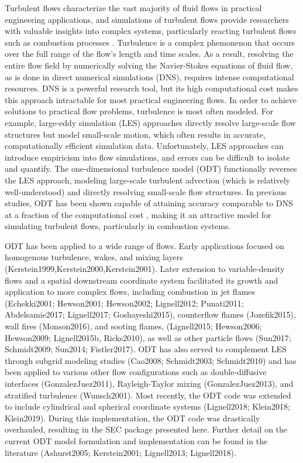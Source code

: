 \documentclass[preprint,12pt, a4paper]{elsarticle}
\begin{document}
Turbulent flows characterize the vast majority of fluid flows in practical engineering applications, and simulations of turbulent flows provide researchers with valuable insights into complex systems, particularly reacting turbulent flows such as combustion processes \cite{Pope2000}. Turbulence is a complex phemonenon that occurs over the full range of the flow's length and time scales. As a result, resolving the entire flow field by numerically solving the Navier-Stokes equations of fluid flow, as is done in direct numerical simulations (DNS), requires intense computational resources. DNS is a powerful research tool, but its high computational cost makes this approach intractable for most practical engineering flows. In order to achieve solutions to practical flow problems, turbulence is most often modeled. For example, large-eddy simulation (LES) approaches directly resolve large-scale flow structures but model small-scale motion, which often results in accurate, computationally efficient simulation data. Unfortunately, LES approaches can introduce empiricism into flow simulations, and errors can be difficult to isolate and quantify. The one-dimensional turbulence model (ODT) functionally reverses the LES approach, modeling large-scale turbulent advection (which is relatively well-understood) and directly resolving small-scale flow structures. In previous studies, ODT has been shown capable of attaining accuracy comparable to DNS at a fraction of the computational cost \cite{Lignell2015,Abboud2015}, making it an attractive model for simulating turbulent flows, particularly in combustion systems. 

ODT has been applied to a wide range of flows. Early applications focused on homogenous turbulence, wakes, and mixing layers (Kerstein1999,Kerstein2000,Kerstein2001). Later extension to variable-density flows and a spatial downstream coordinate system facilitated its growth and application to more complex flows, including combustion in jet flames (Echekki2001; Hewson2001; Hewson2002; Lignell2012; Punati2011; Abdelsamie2017; Lignell2017; Goshayeshi2015), counterflow flames  (Jozefik2015), wall fires (Monson2016), and sooting flames, (Lignell2015; Hewson2006; Hewson2009; Lignell2015b, Ricks2010), as well as other particle flows (Sun2017; Schmidt2009; Sun2014; Fistler2017).  ODT has also served to complement LES through subgrid modeling studies (Cao2008; Schmidt2003; Schmidt2010) and has been applied to various other flow configurations such as double-diffusive interfaces (GonzalezJuez2011), Rayleigh-Taylor mixing (GonzalezJuez2013), and stratified turbulence (Wunsch2001).  Most recently, the ODT code was extended to include cylindrical and spherical coordinate systems (Lignell2018; Klein2018; Klein2019). During this implementation, the ODT code was drastically overhauled, resulting in the SEC package presented here. Further detail on the current ODT model formulation and implementation can be found in the literature (Ashurst2005; Kerstein2001; Lignell2013; Lignell2018).
\end{document}

